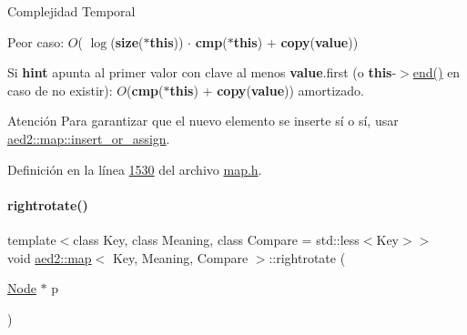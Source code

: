 \begin{DoxyDescription}
\item[Complejidad Temporal]
\begin{DoxyItemize}
\item Peor caso\+: $O$( $\log$({\bfseries size}({\bfseries $\ast$this})) $\cdot$ {\bfseries cmp}({\bfseries $\ast$this}) $+$ {\bfseries copy}({\bfseries value}))
\item Si {\bfseries hint} apunta al primer valor con clave al menos {\bfseries value}.first (o {\bfseries this}-\/$>$\hyperlink{classaed2_1_1map_a76023e6a56cb625513e1b5ea028bf983_a76023e6a56cb625513e1b5ea028bf983}{end()} en caso de no existir)\+: $O$({\bfseries cmp}({\bfseries $\ast$this}) $+$ {\bfseries copy}({\bfseries value})) amortizado. 
\end{DoxyItemize}
\end{DoxyDescription}

\begin{DoxyAttention}{Atención}
Para garantizar que el nuevo elemento se inserte sí o sí, usar \hyperlink{classaed2_1_1map_a2ef6723c183916276b0afc4a4c721475_a2ef6723c183916276b0afc4a4c721475}{aed2\+::map\+::insert\+\_\+or\+\_\+assign}. 
\end{DoxyAttention}


Definición en la línea \hyperlink{map_8h_source_l01530}{1530} del archivo \hyperlink{map_8h_source}{map.\+h}.

\mbox{\label{classaed2_1_1map_a816d69fa4dfe18a984dc3628fee14e2f_a816d69fa4dfe18a984dc3628fee14e2f}} 
\paragraph{\texorpdfstring{rightrotate()}{rightrotate()}}
{\footnotesize\ttfamily template$<$class Key, class Meaning, class Compare = std\+::less$<$\+Key$>$$>$ \\
void \hyperlink{classaed2_1_1map}{aed2\+::map}$<$ Key, Meaning, Compare $>$\+::rightrotate (\begin{DoxyParamCaption}\item[{\hyperlink{structaed2_1_1map_1_1Node}{Node} $\ast$}]{p }\end{DoxyParamCaption})\hspace{0.3cm}{\ttfamily [inline]}}



